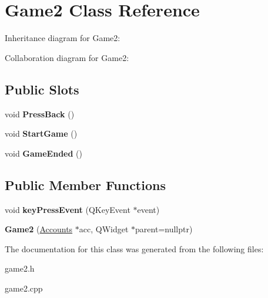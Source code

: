 \hypertarget{classGame2}{}\section{Game2 Class Reference}
\label{classGame2}


Inheritance diagram for Game2\+:


Collaboration diagram for Game2\+:
\subsection*{Public Slots}
\begin{DoxyCompactItemize}
\item 
\mbox{\label{classGame2_a06e537364fffde28c04697db4855ade0}} 
void {\bfseries Press\+Back} ()
\item 
\mbox{\label{classGame2_a2f51124a2ec3758fbc1bfd056ca137b6}} 
void {\bfseries Start\+Game} ()
\item 
\mbox{\label{classGame2_a39a8191a0c66453ed1070db56415f2a9}} 
void {\bfseries Game\+Ended} ()
\end{DoxyCompactItemize}
\subsection*{Public Member Functions}
\begin{DoxyCompactItemize}
\item 
\mbox{\label{classGame2_ac6326093ed2adead3b2b4b7e348e81a4}} 
void {\bfseries key\+Press\+Event} (Q\+Key\+Event $\ast$event)
\item 
\mbox{\label{classGame2_aed6d39c94901e001745239ee6566e6d5}} 
{\bfseries Game2} (\hyperlink{classAccounts}{Accounts} $\ast$acc, Q\+Widget $\ast$parent=nullptr)
\end{DoxyCompactItemize}


The documentation for this class was generated from the following files\+:\begin{DoxyCompactItemize}
\item 
game2.\+h\item 
game2.\+cpp\end{DoxyCompactItemize}
